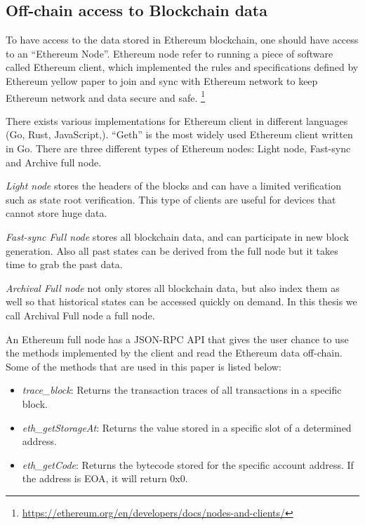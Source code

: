 \subsection{Off-chain access to Blockchain data}

To have access to the data stored in Ethereum blockchain, one should have access to an ``Ethereum Node''. Ethereum node refer to running a piece of software called Ethereum client, which implemented the rules and specifications defined by Ethereum yellow paper  to join and sync with Ethereum network to keep Ethereum network and data secure and safe.
\footnote{\url{https://ethereum.org/en/developers/docs/nodes-and-clients/}} 

There exists various implementations for Ethereum client in different languages (\eg Go, Rust, JavaScript,\etc). ``Geth'' is the most widely used Ethereum client written in Go. 
There are three different types of Ethereum nodes: Light node, Fast-sync and Archive full node.

\textit{Light node} stores the headers of the blocks and can have a limited verification such as state root verification. This type of clients are useful for devices that cannot store huge data.

\textit{Fast-sync Full node} stores all blockchain data, and can participate in new block generation. Also all past states can be derived from the full node but it takes time to grab the past data.

\textit{Archival Full node} not only stores all blockchain data, but also index them as well so that historical states can be accessed quickly on demand. In this thesis we call Archival Full node a
full node. 

An Ethereum full node has a JSON-RPC API that gives the user chance to use the methods implemented by the client and read the Ethereum data off-chain. Some of the methods that are used in this paper is listed below:

\begin{itemize}
    \item \emph{trace\_block}: Returns the transaction traces of all transactions in a specific block.
    \item \emph{eth\_getStorageAt}: Returns the value stored in a specific slot of a determined address. 
    \item \emph{eth\_getCode}: Returns the bytecode stored for the specific account address. If the address is EOA, it will return 0x0.
\end{itemize}

